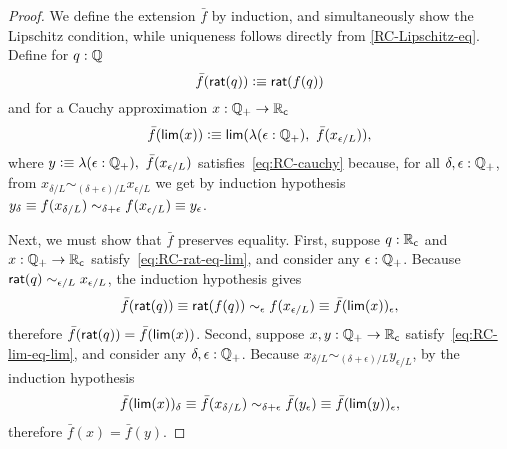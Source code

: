 \begin{proof}
  We define the extension $\bar{f}$ by induction, and simultaneously show the Lipschitz
  condition, while uniqueness follows directly from \autoref{RC-Lipschitz-eq}. Define for
  $q : \mathbb{Q}$
  \begin{equation*}
    \bar{f}(\mathsf{rat}(q)) \vcentcolon\equiv \mathsf{rat}(f(q))
  \end{equation*}
  and for a Cauchy approximation $x : \mathbb{Q}_{+} \to \mathbb{R}_\mathsf{c}$
  \begin{equation*}
    \bar{f}(\rclim(x)) \defeq \rclim(\lam{\epsilon : \Qp} \bar{f}(x_{\epsilon/L})),
  \end{equation*}
  where $y \defeq \lam{\epsilon : \Qp} \bar{f}(x_{\epsilon/L})$
  satisfies~\eqref{eq:RC-cauchy} because, for all $\delta, \epsilon : \mathbb{Q}_{+}$, from
  $x_{\delta/L} \sim_{(\delta + \epsilon)/L} x_{\epsilon/L}$ we get by induction
  hypothesis $y_\delta \equiv f(x_{\delta/L}) \sim_{\delta + \epsilon} f(x_{\epsilon/L})
  \equiv y_\epsilon$.

  Next, we must show that $\bar{f}$ preserves equality. First, suppose $q : \mathbb{R}_\mathsf{c}$ and
  $x : \mathbb{Q}_{+} \to \mathbb{R}_\mathsf{c}$ satisfy~\eqref{eq:RC-rat-eq-lim}, and consider any $\epsilon : \mathbb{Q}_{+}$.
  Because $\mathsf{rat}(q) \sim_{\epsilon/L} x_{\epsilon/L}$, the induction hypothesis gives
  \begin{equation*}
    \bar{f}(\mathsf{rat}(q)) \equiv \mathsf{rat}(f(q))
    \sim_{\epsilon} f(x_{\epsilon/L}) \equiv \bar{f}(\mathsf{lim}(x))_\epsilon,
  \end{equation*}
  therefore $\bar{f}(\mathsf{rat}(q)) = \bar{f}(\mathsf{lim}(x))$. Second, suppose $x, y : \mathbb{Q}_{+} \to
  \mathbb{R}_\mathsf{c}$ satisfy~\eqref{eq:RC-lim-eq-lim}, and consider any $\delta, \epsilon : \mathbb{Q}_{+}$.
  Because $x_{\delta/L} \sim_{(\delta + \epsilon)/L} y_{\epsilon/L}$, by the induction
  hypothesis
  \begin{equation*}
    \bar{f}(\mathsf{lim}(x))_\delta \equiv \bar{f}(x_{\delta/L}) \sim_{\delta + \epsilon}
    \bar{f}(y_{\epsilon}) \equiv \bar{f}(\mathsf{lim}(y))_\epsilon,
  \end{equation*}
  therefore $\bar{f}(x) = \bar{f}(y)$.


\end{proof}
